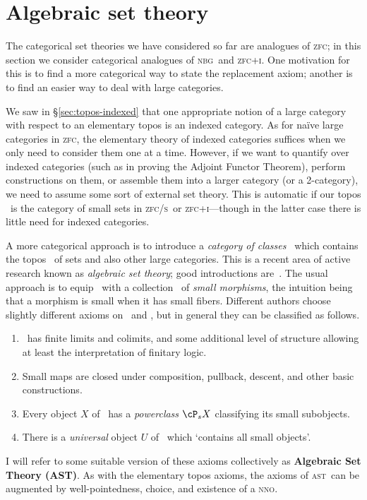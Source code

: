 \documentclass[12pt]{amsart}
\def\zfc{\textsc{zfc}}
\def\zfci{\textsc{zfc+i}}
\def\zfcs{\textsc{zfc/s}}
\def\nbg{\textsc{nbg}}
\def\nno{\textsc{nno}}
\def\ast{\textsc{ast}}
\begin{document}
\section{Algebraic set theory}
\label{sec:ast}

The categorical set theories we have considered so far are analogues
of \zfc; in this section we consider categorical analogues of \nbg\
and \zfci.  One motivation for this is to find a more categorical way
to state the replacement axiom; another is to find an easier way to
deal with large categories.

We saw in \S\ref{sec:topos-indexed} that one appropriate notion of a
large category with respect to an elementary topos is an indexed
category.  As for na\"ive large categories in \zfc, the elementary
theory of indexed categories suffices when we only need to consider
them one at a time.  However, if we want to quantify over indexed
categories (such as in proving the Adjoint Functor Theorem), perform
constructions on them, or assemble them into a larger category (or a
2-category), we need to assume some sort of external set theory.  This
is automatic if our topos \bS\ is the category of small sets in \zfcs\
or \zfci---though in the latter case there is little need for indexed
categories.

A more categorical approach is to introduce a \emph{category of
  classes} \bC\ which contains the topos \bS\ of sets and also other
large categories.  This is a recent area of active research known as
\emph{algebraic set theory}; good introductions
are~\cite{awodey:outl-ast,jm:ast}.  The usual approach is to equip
\bC\ with a collection \cS\ of \emph{small morphisms}, the intuition
being that a morphism is small when it has small fibers.  Different
authors choose slightly different axioms on \bC\ and \cS, but in
general they can be classified as follows.
\begin{enumerate}
\item \bC\ has finite limits and colimits, and some additional level
  of structure allowing at least the interpretation of finitary logic.
\item Small maps are closed under composition, pullback, descent, and
  other basic constructions.
\item Every object $X$ of \bC\ has a \emph{powerclass} $\cP_s X$
  classifying its small subobjects.
\item There is a \emph{universal} object $U$ of \bC\ which `contains
  all small objects'.
\end{enumerate}
I will refer to some suitable version of these axioms collectively as
\textbf{Algebraic Set Theory (AST)}.  As with the elementary topos
axioms, the axioms of \ast\ can be augmented by well-pointedness,
choice, and existence of a \nno.
\end{document}
